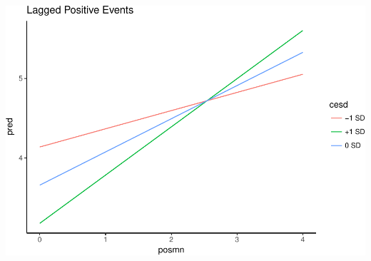 \documentclass[]{article}
\begin{document}
\includegraphics{Beck_HW_7_R_2_files/figure-latex/unnamed-chunk-13-2.pdf}
\end{document}
